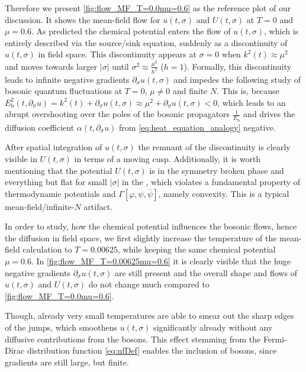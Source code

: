 Therefore we present \cref{fig:flow_MF_T=0.0mu=0.6} as the reference plot of our discussion. It shows the mean-field \frg{} flow for $u ( t, \sigma )$ and $U ( t, \sigma )$ at $T = 0$ and $\mu = 0.6$. As predicted the chemical potential enters the \frg{} flow of $u ( t, \sigma )$, which is entirely described via the source/sink equation, suddenly as a discontinuity of $u ( t, \sigma )$ in field space. This discontinuity appears at $\sigma = 0$ when $k^2 ( t ) \approx \mu^2$ and moves towards larger $| \sigma |$ until $\sigma^2 \approx \tfrac{\mu^2}{h^2}$ ($h = 1$). Formally, this discontinuity leads to infinite negative gradients $\partial_\sigma u ( t, \sigma )$ and impedes the following study of bosonic quantum fluctuations at $T = 0$, $\mu \neq 0$ and finite $N$. This is, because $E^2_\mathrm{b} ( t, \partial_\sigma u ) = k^2 ( t ) + \partial_\sigma u ( t, \sigma ) \approx \mu^2 + \partial_\sigma u ( t, \sigma ) < 0$, which leads to an abrupt overshooting over the poles of the bosonic propagators $\tfrac{1}{E_\mathrm{b}}$ and drives the diffusion coefficient $\alpha ( t, \partial_\sigma u )$ from \cref{eq:heat_equation_analogy} negative.

After spatial integration of $u ( t, \sigma )$ the remnant of the discontinuity is clearly visible in $U ( t, \sigma )$ in terms of a moving cusp. Additionally, it is worth mentioning that the potential $U ( t, \sigma )$ is in the symmetry broken phase and everything but flat for small $|\sigma|$ in the \ir{}, which violates a fundamental property of thermodynamic potentials and $\Gamma [ \varphi, \psi,\bar{\psi}]$, namely convexity. This is a typical mean-field/infinite-$N$ artifact.\bigskip

In order to study, how the chemical potential influences the bosonic \frg{} flows, hence the diffusion in field space, we first slightly increase the temperature of the mean-field calculation to $T = 0.00625$, while keeping the same chemical potential $\mu = 0.6$. In \cref{fig:flow_MF_T=0.00625mu=0.6} it is clearly visible that the huge negative gradients $\partial_\sigma u ( t, \sigma )$ are still present and the overall shape and flows of $u ( t, \sigma )$ and $U ( t, \sigma )$ do not change much compared to \cref{fig:flow_MF_T=0.0mu=0.6}.

Though, already very small temperatures are able to smear out the sharp edges of the jumps, which smoothens $u ( t, \sigma )$ significantly already without any diffusive contributions from the bosons. This effect stemming from the Fermi-Dirac distribution function \eqref{eq:nfDef} enables the inclusion of bosons, since gradients are still large, but finite.\bigskip

